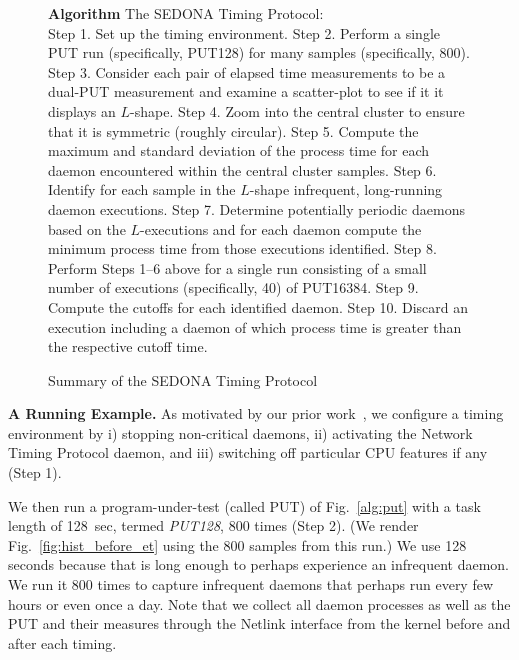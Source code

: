 \documentclass[letter]{ieice}
\begin{document}
\begin{figure}[h]
\begin{center}
\begin{algorithmic}
{\bf Algorithm} The SEDONA Timing Protocol: \\
\STATE Step 1. Set up the timing environment.
\STATE Step 2. Perform a single PUT run (specifically, PUT128) for many samples (specifically, 800).
\STATE Step 3. Consider each pair of elapsed time measurements to be a dual-PUT measurement 
and examine a scatter-plot to see if it it displays an $L$-shape.
\STATE Step 4. Zoom into the central cluster to ensure that it is symmetric (roughly circular).
\STATE Step 5. Compute the maximum and standard deviation of the process time 
for each daemon encountered within the central cluster samples.
\STATE Step 6. Identify for each sample in the $L$-shape infrequent, long-running daemon executions. 
\STATE Step 7. Determine potentially periodic daemons based on the $L$-executions 
and for each daemon compute the minimum process time from those executions identified. 
\STATE Step 8. Perform Steps 1--6 above for a single run 
consisting of a small number of executions (specifically, 40) of PUT16384.  
\STATE Step 9. Compute the cutoffs for each identified daemon. 
\STATE Step 10. Discard an execution including a daemon of which process time is greater than the respective cutoff time.
\end{algorithmic}
\end{center}
\caption{Summary of the SEDONA Timing Protocol\label{alg:find}}
\vspace{-0.25in}
\end{figure}
%


{\bf A Running Example.} 
As motivated by our prior work~\cite{Currim}, 
we configure a timing environment by i) stopping non-critical daemons, 
ii) activating the Network Timing Protocol daemon, and 
iii) switching off particular CPU features\cite{intel15,intelSpeed15} if any (Step 1). 

We then run a program-under-test (called PUT) of 
Fig.~\ref{alg:put} with a task length of 128~sec, 
termed {\em PUT128}, 800 times (Step 2). 
(We render Fig.~\ref{fig:hist_before_et} using the 800 samples from this run.)
We use 128 seconds because that is long enough to perhaps experience an infrequent daemon. 
We run it 800 times to capture infrequent daemons that perhaps run every few hours or even 
once a day. 
Note that we collect all daemon processes as well as the PUT and their measures 
through the Netlink interface from the kernel before and after each 
timing.
\end{document}
